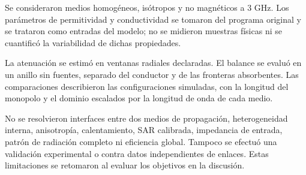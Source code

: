 Se consideraron medios homogéneos, isótropos y no magnéticos a 3 GHz. Los parámetros de permitividad y conductividad se tomaron del programa original y se trataron como entradas del modelo; no se midieron muestras físicas ni se cuantificó la variabilidad de dichas propiedades.

La atenuación se estimó en ventanas radiales declaradas. El balance se evaluó en un anillo sin fuentes, separado del conductor y de las fronteras absorbentes. Las comparaciones describieron las configuraciones simuladas, con la longitud del monopolo y el dominio escalados por la longitud de onda de cada medio.

No se resolvieron interfaces entre dos medios de propagación, heterogeneidad interna, anisotropía, calentamiento, SAR calibrada, impedancia de entrada, patrón de radiación completo ni eficiencia global. Tampoco se efectuó una validación experimental o contra datos independientes de enlaces. Estas limitaciones se retomaron al evaluar los objetivos en la discusión.

